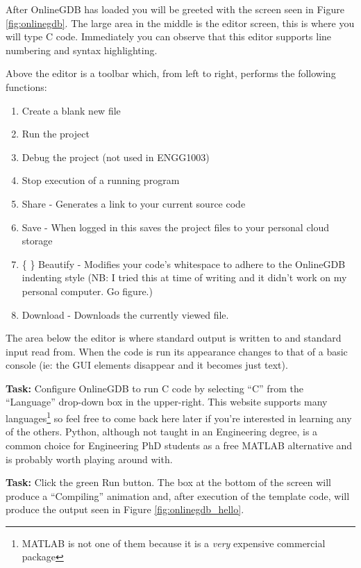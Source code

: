 \documentclass{lab}
\begin{document}
After OnlineGDB has loaded you will be greeted with the screen seen in Figure \ref{fig:onlinegdb}. The large area in the middle is the editor screen, this is where you will type C code. Immediately you can observe that this editor supports line numbering and syntax highlighting.

Above the editor is a toolbar which, from left to right, performs the following functions:

\begin{enumerate}
\item Create a blank new file
\item Run the project
\item Debug the project (not used in ENGG1003)
\item Stop execution of a running program
\item Share - Generates a link to your current source code
\item Save - When logged in this saves the project files to your personal cloud storage
\item \{ \} Beautify - Modifies your code's whitespace to adhere to the OnlineGDB indenting style (NB: I tried this at time of writing and it didn't work on my personal computer. Go figure.)
\item Download - Downloads the currently viewed file.
\end{enumerate}

The area below the editor is where standard output is written to and standard input read from. When the code is run its appearance changes to that of a basic console (ie: the GUI elements disappear and it becomes just text).

\textbf{Task:} Configure OnlineGDB to run C code by selecting ``C'' from the ``Language'' drop-down box in the upper-right. This website supports many languages\footnote{MATLAB is not one of them because it is a \textit{very} expensive commercial package} so feel free to come back here later if you're interested in learning any of the others. Python, although not taught in an Engineering degree, is a common choice for Engineering PhD students as a free MATLAB alternative and is probably worth playing around with.

\textbf{Task:} Click the green Run button. The box at the bottom of the screen will produce a ``Compiling'' animation and, after execution of the template code, will produce the output seen in Figure \ref{fig:onlinegdb_hello}.
\end{document}
